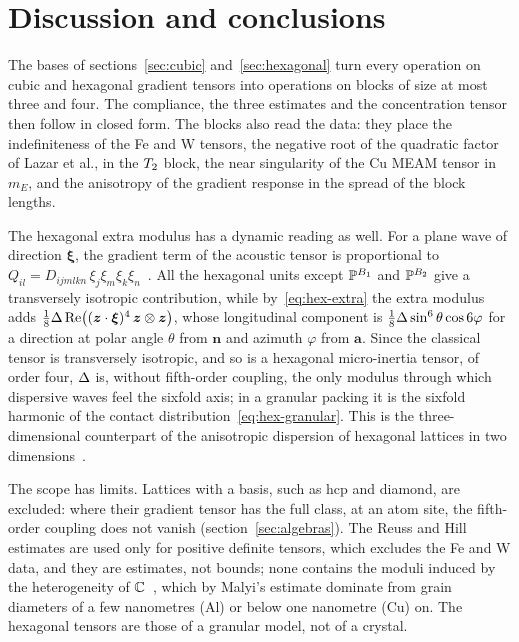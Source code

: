 \section{Discussion and conclusions}\label{sec:conclusions}

The bases of sections~\ref{sec:cubic} and~\ref{sec:hexagonal} turn every operation on
cubic and hexagonal gradient tensors into operations on blocks of size at most three and
four. The compliance, the three estimates and the concentration tensor then follow in closed
form. The blocks also read the data: they place the indefiniteness of the Fe and W tensors,
the negative root of the quadratic factor of Lazar et al., in the $T_2$ block, the near singularity
of the Cu MEAM tensor in $m_E$, and the anisotropy of the gradient response in the spread
of the block lengths.

The hexagonal extra modulus has a dynamic reading as well. For a plane wave of direction
$\bm\xi$, the gradient term of the acoustic tensor is proportional to
$Q_{il}=D_{ijmlkn}\,\xi_j\xi_m\xi_k\xi_n$~\cite[eq.~(11)]{Rosi2016}. All the hexagonal
units except $\mathbb{P}^{B_1}$ and $\mathbb{P}^{B_2}$ give a transversely isotropic contribution, while
by~\eqref{eq:hex-extra} the extra modulus adds
$\tfrac18\Delta\,\mathrm{Re}\big((\bm{z}\cdot\bm\xi)^4\,\bm{z}\otimes\bm{z}\big)$, whose longitudinal
component is $\tfrac18\Delta\sin^6\theta\cos6\varphi$ for a direction at polar angle
$\theta$ from $\bm n$ and azimuth $\varphi$ from $\bm a$. Since the classical tensor is transversely isotropic, and so is a hexagonal micro-inertia
tensor, of order four, $\Delta$ is, without fifth-order coupling, the only modulus through which dispersive
waves feel the sixfold axis; in a granular packing it is the sixfold harmonic of the
contact distribution~\eqref{eq:hex-granular}. This is the three-dimensional
counterpart of the anisotropic dispersion of hexagonal lattices in two
dimensions~\cite{Rosi2016}.

The scope has limits. Lattices with a basis, such as hcp and diamond, are excluded: where
their gradient tensor has the full class, at an atom site, the fifth-order coupling does not
vanish (section~\ref{sec:algebras}). The Reuss and Hill estimates are used only for
positive definite tensors, which excludes the Fe and W data, and they are estimates, not
bounds; none contains the moduli induced by the heterogeneity of $\mathbb{C}$~\cite{Malyi2021},
which by Malyi's estimate dominate from grain diameters of a few nanometres (Al) or below
one nanometre (Cu) on.
The hexagonal tensors are those of a granular model, not of a crystal.

